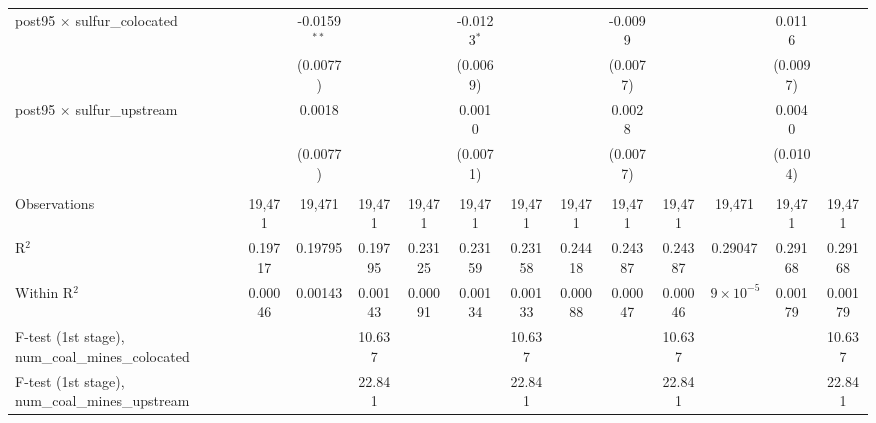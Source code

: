 \begin{table}[htbp]
\begin{adjustbox}{width = \textwidth, center}
\begin{tabular}{lcccccccccccc}
         post95 $\times$ sulfur\_colocated                  &               & -0.0159$^{**}$ &               &               & -0.0123$^{*}$ &               &               & -0.0099       &               &                    & 0.0116        &   \\   
                                                            &               & (0.0077)       &               &               & (0.0069)      &               &               & (0.0077)      &               &                    & (0.0097)      &   \\   
         post95 $\times$ sulfur\_upstream                   &               & 0.0018         &               &               & 0.0010        &               &               & 0.0028        &               &                    & 0.0040        &   \\   
                                                            &               & (0.0077)       &               &               & (0.0071)      &               &               & (0.0077)      &               &                    & (0.0104)      &   \\   
          \\
         Observations                                       & 19,471        & 19,471         & 19,471        & 19,471        & 19,471        & 19,471        & 19,471        & 19,471        & 19,471        & 19,471             & 19,471        & 19,471\\  
         R$^2$                                              & 0.19717       & 0.19795        & 0.19795       & 0.23125       & 0.23159       & 0.23158       & 0.24418       & 0.24387       & 0.24387       & 0.29047            & 0.29168       & 0.29168\\  
         Within R$^2$                                       & 0.00046       & 0.00143        & 0.00143       & 0.00091       & 0.00134       & 0.00133       & 0.00088       & 0.00047       & 0.00046       & $9\times 10^{-5}$  & 0.00179       & 0.00179\\  
         F-test (1st stage), num\_coal\_mines\_colocated    &               &                & 10.637        &               &               & 10.637        &               &               & 10.637        &                    &               & 10.637\\  
         F-test (1st stage), num\_coal\_mines\_upstream     &               &                & 22.841        &               &               & 22.841        &               &               & 22.841        &                    &               & 22.841\\  

\end{tabular}
\end{adjustbox}
\end{table}
